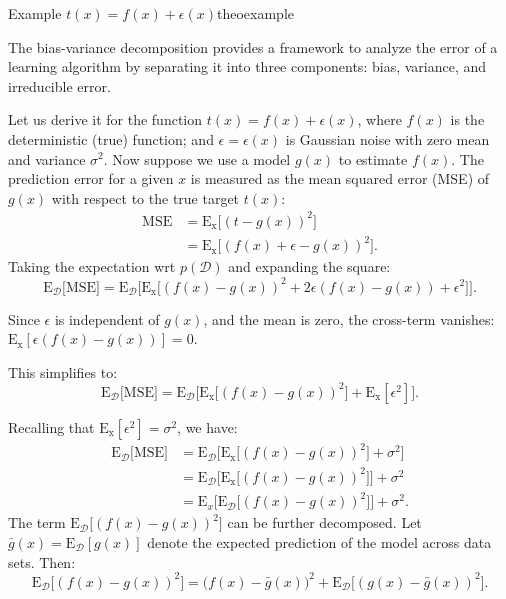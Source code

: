 \documentclass{tufte-handout}
\begin{document}
\begin{mybox}{Example $t(x) = f(x) + \epsilon(x) $}{theoexample}

The {bias-variance decomposition} provides a framework to analyze the error of a learning algorithm by separating it into three components: {bias}, {variance}, and {irreducible error}. 

Let us derive it for the function \( t(x) = f(x) + \epsilon(x) \), where \( f(x) \) is the deterministic (true) function; and \( \epsilon = \epsilon(x)\) is Gaussian noise with zero mean and variance \( \sigma^2 \). Now suppose we use a model \(g(x) \) to estimate \( f(x) \). The prediction error for a given \( x \) is measured as the  {mean squared error} (MSE) of \(g(x) \) with respect to the true target \( t(x) \):
\begin{align*}
\text{MSE} &= \mathrm{E_x} \big[(t -g(x))^2\big] \\
&= \mathrm{E_x} \big[(f(x) + \epsilon -g(x))^2\big].
\end{align*}
Taking the expectation wrt  $p(\mathcal D)$ and expanding the square:
\[
\mathrm E_{\mathcal D} \big[ \text{MSE} \big]= \mathrm E_{\mathcal D} \big[ \mathrm{E_x} \big[(f(x) -g(x))^2 + 2\epsilon(f(x) -g(x)) + \epsilon^2\big]\big].
\]

Since  \( \epsilon \) is independent of \(g(x) \), and the mean is zero, the cross-term vanishes:
$
\mathrm{E_x}[\epsilon(f(x) -g(x))] = 0.
$

This simplifies to:
\[
\mathrm E_{\mathcal D} \big[  \text{MSE}\big] = \mathrm E_{\mathcal D} \big[  \mathrm{E_x} \big[(f(x) -g(x))^2\big] + \mathrm{E_x}[\epsilon^2] \big].
\]

Recalling that \( \mathrm{E_x}[\epsilon^2] = \sigma^2 \), we have:
\begin{align*}
\mathrm E_{\mathcal D} \big[\text{MSE} \big]&=  \mathrm E_{\mathcal D} \big[\mathrm{E_x} \big[(f(x) -g(x))^2\big] + \sigma^2 \big]\\
&=  \mathrm E_{\mathcal D} \big[\mathrm{E_x} \big[(f(x) -g(x))^2\big] \big] + \sigma^2\\
&=  \mathrm E_{x} \big[\mathrm{E_{\mathcal D}} \big[(f(x) -g(x))^2\big] \big] + \sigma^2.
\end{align*}
The term \( \mathrm{E_{\mathcal D}} \big[(f(x) -g(x))^2\big] \) can be further decomposed. Let \( \bar{g}(x) = \mathrm{E_{\mathcal D}}[g(x)] \) denote the expected prediction of the model across data sets. Then:
\[
\mathrm{E_{\mathcal D}} \big[(f(x) -g(x))^2\big] = \big(f(x) - \bar{g}(x)\big)^2 + \mathrm{E_{\mathcal D}} \big[(g(x) - \bar{g}(x))^2\big].
\]


\end{mybox}
\end{document}
